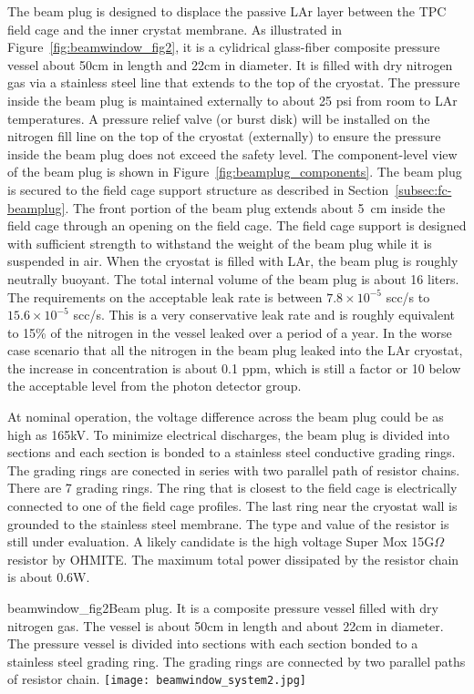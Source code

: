 The beam plug is designed to displace the passive LAr layer between the TPC field cage and the inner crystat membrane. As illustrated in Figure~\ref{fig:beamwindow_fig2}, it is a cylidrical glass-fiber composite pressure vessel about 50cm in length and  22cm in diameter. It is filled with dry nitrogen gas via a stainless steel line that extends to the top of the cryostat. The pressure inside the beam plug is maintained externally to about 25 psi from room to LAr temperatures. A pressure relief valve (or burst disk) will be installed on the nitrogen fill line on the top of the cryostat (externally) to ensure the pressure inside the beam plug does not exceed the safety level. The component-level view of the beam plug is shown in Figure~\ref{fig:beamplug_components}.  The beam plug is secured to the field cage support structure as described in Section~\ref{subsec:fc-beamplug}. The front portion of the beam plug extends about 5~cm inside the field cage through an opening on the field cage. The field cage support is designed with sufficient strength to withstand the weight of the beam plug while it is suspended in air. When the cryostat is filled with LAr, the beam plug is roughly neutrally buoyant.  The total internal volume of the beam plug is about 16 liters. The requirements on the acceptable leak rate is between $7.8\times 10^{-5}$ scc/s to $15.6\times 10^{-5}$ scc/s. This is a very conservative leak rate and is roughly equivalent to 15\% of the nitrogen in the vessel leaked over a period of a year.  In the worse case scenario that all the nitrogen in the beam plug leaked into the LAr cryostat, the increase in concentration is about 0.1 ppm, which is still a factor or 10 below the acceptable level from the photon detector group.

At nominal operation, the voltage difference across the beam plug could be as high as 165kV. To minimize electrical discharges, the beam plug is divided into sections and each section is bonded to a stainless steel conductive grading rings. The grading rings are conected in series with two parallel path of resistor chains. There are 7 grading rings. The ring that is closest to the field cage is electrically connected to one of the field cage profiles. The last ring near the cryostat wall is grounded to the stainless steel membrane. The type and value of the resistor is still under evaluation. A likely candidate is the high voltage Super Mox 15G$\Omega$ resistor by OHMITE. The maximum total power dissipated by the resistor chain is about 0.6W.

\begin{cdrfigure}{beamwindow_fig2}{Beam plug. It is a  composite pressure vessel filled with dry nitrogen gas. The vessel is about 50cm in length and about 22cm in diameter. The pressure vessel is divided into sections with each section bonded to a stainless steel grading ring. The grading rings are connected by two parallel paths of resistor chain.}
  \texttt{[image: beamwindow\_system2.jpg]}
\end{cdrfigure}

